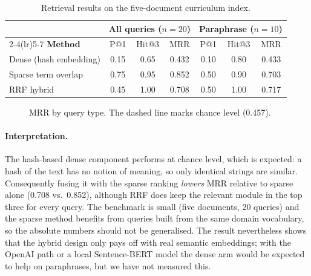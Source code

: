 \documentclass[openany]{tietreport}
\begin{document}
\begin{table}[h]
\centering\small
\begin{tabular}{@{}l ccc ccc@{}}
\toprule
 & \multicolumn{3}{c}{\textbf{All queries ($n=20$)}} & \multicolumn{3}{c}{\textbf{Paraphrase ($n=10$)}} \\
\cmidrule(lr){2-4}\cmidrule(lr){5-7}
\textbf{Method} & P@1 & Hit@3 & MRR & P@1 & Hit@3 & MRR \\
\midrule
Dense (hash embedding) & 0.15 & 0.65 & 0.432 & 0.10 & 0.80 & 0.433 \\
Sparse term overlap & 0.75 & 0.95 & 0.852 & 0.50 & 0.90 & 0.703 \\
RRF hybrid & 0.45 & 1.00 & 0.708 & 0.50 & 1.00 & 0.717 \\
\bottomrule
\end{tabular}
\caption{Retrieval results on the five-document curriculum index.}
\label{tab:rag}
\end{table}

\begin{figure}[h]
\centering
{}
\caption{MRR by query type. The dashed line marks chance level (0.457).}
\label{fig:rag}
\end{figure}

\paragraph{Interpretation.} The hash-based dense component performs at chance level, which is expected: a hash of the text has no notion of meaning, so only identical strings are similar. Consequently fusing it with the sparse ranking \emph{lowers} MRR relative to sparse alone (0.708 vs.\ 0.852), although RRF does keep the relevant module in the top three for every query. The benchmark is small (five documents, 20 queries) and the sparse method benefits from queries built from the same domain vocabulary, so the absolute numbers should not be generalised. The result nevertheless shows that the hybrid design only pays off with real semantic embeddings; with the OpenAI path or a local Sentence-BERT model the dense arm would be expected to help on paraphrases, but we have not measured this.
\end{document}
